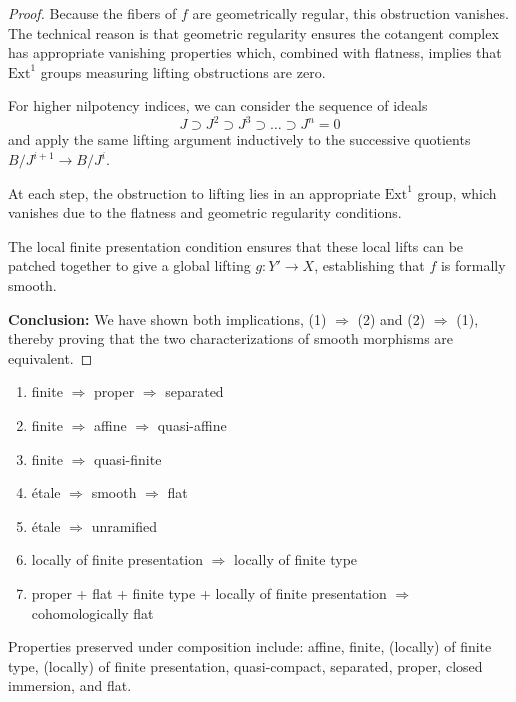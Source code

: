 \documentclass[12pt]{article}
\begin{document}
\begin{proof}
    \noindent Because the fibers of $f$ are geometrically regular, this obstruction vanishes. The technical reason is that geometric regularity ensures the cotangent complex has appropriate vanishing properties which, combined with flatness, implies that $\text{Ext}^1$ groups measuring lifting obstructions are zero.

    \medskip
    \noindent For higher nilpotency indices, we can consider the sequence of ideals
    \begin{equation}
        J \supset J^2 \supset J^3 \supset \ldots \supset J^n = 0
    \end{equation}
    and apply the same lifting argument inductively to the successive quotients $B/J^{i+1} \to B/J^i$.

    \medskip
    \noindent At each step, the obstruction to lifting lies in an appropriate $\text{Ext}^1$ group, which vanishes due to the flatness and geometric regularity conditions.

    \medskip
    \noindent The local finite presentation condition ensures that these local lifts can be patched together to give a global lifting $g: Y' \to X$, establishing that $f$ is formally smooth.

    \medskip
    \noindent \textbf{Conclusion:} We have shown both implications, (1) $\Rightarrow$ (2) and (2) $\Rightarrow$ (1), thereby proving that the two characterizations of smooth morphisms are equivalent.
\end{proof}


\begin{enumerate}
    \item finite $\Rightarrow$ proper $\Rightarrow$ separated
    \item finite $\Rightarrow$ affine $\Rightarrow$ quasi-affine
    \item finite $\Rightarrow$ quasi-finite
    \item étale $\Rightarrow$ smooth $\Rightarrow$ flat
    \item étale $\Rightarrow$ unramified
    \item locally of finite presentation $\Rightarrow$ locally of finite type
    \item proper + flat + finite type + locally of finite presentation $\Rightarrow$ cohomologically flat
\end{enumerate}

Properties preserved under composition include: affine, finite, (locally) of finite type, (locally) of finite presentation, quasi-compact, separated, proper, closed immersion, and flat.
\end{document}
